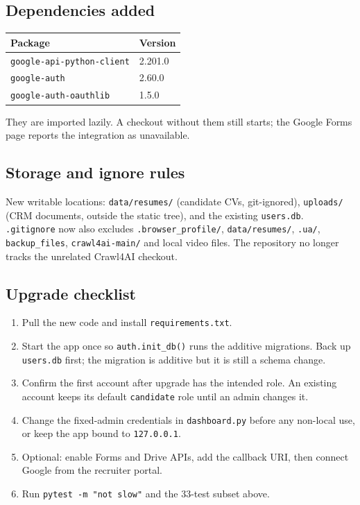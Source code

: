 \documentclass[11pt,a4paper]{article}
\newcommand{\file}[1]{\texttt{\small #1}}
\newcommand{\code}[1]{\texttt{#1}}
\begin{document}
\subsection{Dependencies added}
\begin{center}
\begin{tabular}{@{}ll@{}}
\toprule
\textbf{Package} & \textbf{Version}\\
\midrule
\file{google-api-python-client} & 2.201.0\\
\file{google-auth} & 2.60.0\\
\file{google-auth-oauthlib} & 1.5.0\\
\bottomrule
\end{tabular}
\end{center}
They are imported lazily. A checkout without them still starts; the Google
Forms page reports the integration as unavailable.

\subsection{Storage and ignore rules}
New writable locations:
\file{data/resumes/} (candidate CVs, git-ignored),
\file{uploads/} (CRM documents, outside the static tree), and the existing
\file{users.db}. \file{.gitignore} now also excludes
\code{.browser\_profile/}, \file{data/resumes/}, \file{.ua/},
\file{backup\_files}, \file{crawl4ai-main/} and local video files. The
repository no longer tracks the unrelated Crawl4AI checkout.

\subsection{Upgrade checklist}
\begin{enumerate}[leftmargin=2em]
  \item Pull the new code and install \file{requirements.txt}.
  \item Start the app once so \code{auth.init\_db()} runs the additive
        migrations. Back up \file{users.db} first; the migration is additive
        but it is still a schema change.
  \item Confirm the first account after upgrade has the intended role. An
        existing account keeps its default \code{candidate} role until an
        admin changes it.
  \item Change the fixed-admin credentials in \file{dashboard.py} before any
        non-local use, or keep the app bound to \code{127.0.0.1}.
  \item Optional: enable Forms and Drive APIs, add the callback URI, then
        connect Google from the recruiter portal.
  \item Run \code{pytest -m "not slow"} and the 33-test subset above.
\end{enumerate}
\end{document}
